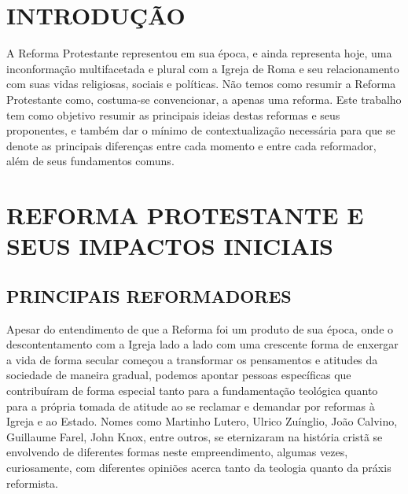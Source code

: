 \documentclass[
    article,            %
	12pt,				%
	oneside,			%
	a4paper,			%
	chapter=TITLE,		%
	section=TITLE,		%
	english,			%
	french,				%
	spanish,			%
	brazil				%
	]{abntex2}
\begin{document}



\imprimircapa

\imprimirfolhaderosto

\tableofcontents*
\cleardoublepage

\textual
\pagestyle{simple}


\section{INTRODUÇÃO}
A Reforma Protestante representou em sua época, e ainda representa hoje, uma inconformação multifacetada e plural com a Igreja de Roma e seu relacionamento com suas vidas religiosas, sociais e políticas. Não temos como resumir a Reforma Protestante como, costuma-se convencionar, a apenas uma reforma. Este trabalho tem como objetivo resumir as principais ideias destas reformas e seus proponentes, e também dar o mínimo de contextualização necessária para que se denote as principais diferenças entre cada momento e entre cada reformador, além de seus fundamentos comuns.

\section{REFORMA PROTESTANTE E SEUS IMPACTOS INICIAIS}

\subsection{PRINCIPAIS REFORMADORES}
Apesar do entendimento de que a Reforma foi um produto de sua época, onde o descontentamento com a Igreja lado a lado com uma crescente forma de enxergar a vida de forma secular começou a transformar os pensamentos e atitudes da sociedade de maneira gradual, podemos apontar pessoas específicas que contribuíram de forma especial tanto para a fundamentação teológica quanto para a própria tomada de atitude ao se reclamar e demandar por reformas à Igreja e ao Estado. Nomes como Martinho Lutero, Ulrico Zuínglio, João Calvino, Guillaume Farel, John Knox, entre outros, se eternizaram na história cristã se envolvendo de diferentes formas neste empreendimento, algumas vezes, curiosamente, com diferentes opiniões acerca tanto da teologia quanto da práxis reformista.
\end{document}
